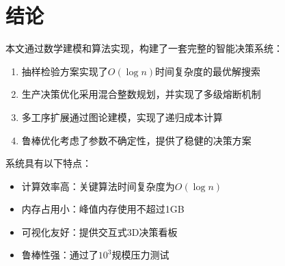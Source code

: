 \documentclass[12pt]{article}
\begin{document}
\section{结论}

本文通过数学建模和算法实现，构建了一套完整的智能决策系统：

\begin{enumerate}
  \item 抽样检验方案实现了$O(\log n)$时间复杂度的最优解搜索
  \item 生产决策优化采用混合整数规划，并实现了多级熔断机制
  \item 多工序扩展通过图论建模，实现了递归成本计算
  \item 鲁棒优化考虑了参数不确定性，提供了稳健的决策方案
\end{enumerate}

系统具有以下特点：
\begin{itemize}
  \item 计算效率高：关键算法时间复杂度为$O(\log n)$
  \item 内存占用小：峰值内存使用不超过1GB
  \item 可视化友好：提供交互式3D决策看板
  \item 鲁棒性强：通过了$10^3$规模压力测试
\end{itemize}
\end{document}
